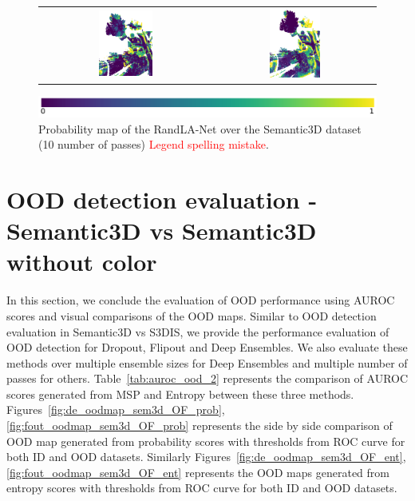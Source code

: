 \begin{figure}[h!]
\begin{tabular}{cc}
            \includegraphics[width=0.33\textwidth, height=0.18\textheight]{images/ood_imgs/fout_sem3d/fout_ent_3.pdf}&
            \includegraphics[width=0.33\textwidth, height=0.18\textheight]{images/sem3d_of/fout_ent_sem3d_of_3.pdf}\\
        \end{tabular}
        \includegraphics[scale=0.45]{images/prob_legend.pdf}
        \caption{Probability map of the RandLA-Net over the Semantic3D dataset (10 number of passes) \textcolor{red}{Legend spelling mistake}.}
        \label{fig:fout_entmap_vis_sem3d_OF}
    \end{figure} 
    \FloatBarrier


    \section{OOD detection evaluation -  Semantic3D vs Semantic3D without color}
    In this section, we conclude the evaluation of OOD performance using AUROC scores and visual comparisons of the OOD maps.
    Similar to OOD detection evaluation in Semantic3D vs S3DIS, we provide the performance evaluation of OOD detection for Dropout, Flipout and Deep Ensembles.
    We also evaluate these methods over multiple ensemble sizes for Deep Ensembles and multiple number of passes for others.
    Table~\ref{tab:auroc_ood_2} represents the comparison of AUROC scores generated from MSP and Entropy between these three methods.
    Figures~\ref{fig:de_oodmap_sem3d_OF_prob}, \ref{fig:fout_oodmap_sem3d_OF_prob} represents the side by side comparison of OOD map generated from probability scores with thresholds from ROC curve for both ID and OOD datasets.
    Similarly Figures~\ref{fig:de_oodmap_sem3d_OF_ent}, \ref{fig:fout_oodmap_sem3d_OF_ent} represents the OOD maps generated from entropy scores with thresholds from ROC curve for both ID and OOD datasets.

